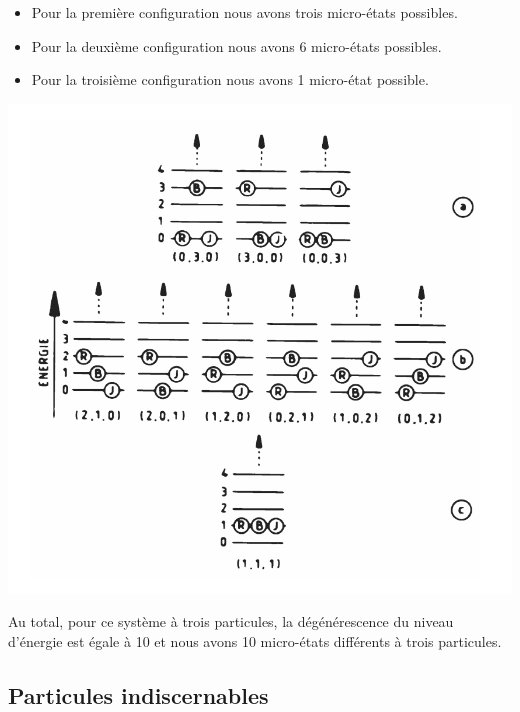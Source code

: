 \documentclass[12pt,oneside]{book}
\begin{document}
\begin{minipage}{0.6\linewidth}
	\begin{itemize}
		\item Pour la première configuration nous avons trois micro-états possibles.
		\item Pour la deuxième configuration nous avons 6 micro-états possibles.
		\item Pour la troisième configuration nous avons 1 micro-état possible.
	\end{itemize}
\end{minipage}
\begin{minipage}{0.4\linewidth}
	\includegraphics[width=\linewidth]{../pic/3306/6}
\end{minipage}
Au total, pour ce système à trois particules, la dégénérescence du niveau d'énergie est égale à 10 et nous avons 10 micro-états différents à trois particules.
\subsection{Particules indiscernables}
\end{document}

